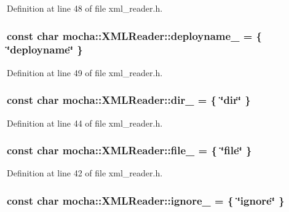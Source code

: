 Definition at line 48 of file xml\_\-reader.h.

\hypertarget{classmocha_1_1_x_m_l_reader_acf67bd089a4dd7bf722f6c4112ef3970}{
\subsubsection[{deployname\_\-}]{\setlength{\rightskip}{0pt plus 5cm}const char {\bf mocha::XMLReader::deployname\_\-} = \{ \char`\"{}deployname\char`\"{} \}}}
\label{classmocha_1_1_x_m_l_reader_acf67bd089a4dd7bf722f6c4112ef3970}


Definition at line 49 of file xml\_\-reader.h.

\hypertarget{classmocha_1_1_x_m_l_reader_a129a6a3323241afb155f6441c55773af}{
\subsubsection[{dir\_\-}]{\setlength{\rightskip}{0pt plus 5cm}const char {\bf mocha::XMLReader::dir\_\-} = \{ \char`\"{}dir\char`\"{} \}}}
\label{classmocha_1_1_x_m_l_reader_a129a6a3323241afb155f6441c55773af}


Definition at line 44 of file xml\_\-reader.h.

\hypertarget{classmocha_1_1_x_m_l_reader_a01924180e01a5125b2442b58da57a856}{
\subsubsection[{file\_\-}]{\setlength{\rightskip}{0pt plus 5cm}const char {\bf mocha::XMLReader::file\_\-} = \{ \char`\"{}file\char`\"{} \}}}
\label{classmocha_1_1_x_m_l_reader_a01924180e01a5125b2442b58da57a856}


Definition at line 42 of file xml\_\-reader.h.

\hypertarget{classmocha_1_1_x_m_l_reader_a749252cf2d5c3cf2913f6e3cfb281102}{
\subsubsection[{ignore\_\-}]{\setlength{\rightskip}{0pt plus 5cm}const char {\bf mocha::XMLReader::ignore\_\-} = \{ \char`\"{}ignore\char`\"{} \}}}
\label{classmocha_1_1_x_m_l_reader_a749252cf2d5c3cf2913f6e3cfb281102}


